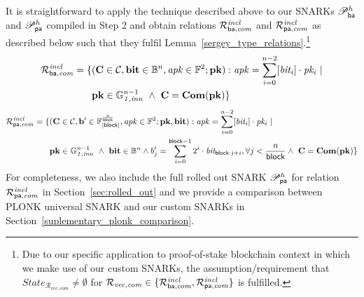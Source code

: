 \noindent It is straightforward to apply the technique described above to our SNARKs $\mathscr{P}_{\mathsf{ba}}^{h}$ and $\mathscr{P}_{\mathsf{pa}}^{h}$ 
compiled in Step 2 and obtain relations $\mathcal{R}^{\mathit{incl}}_{\mathsf{ba},\mathit{com}}$ and $\mathcal{R}^{\mathit{incl}}_{\mathsf{pa},\mathit{com}}$ as described below such that they fulfil Lemma~\ref{sergey_type_relations}.\footnote{Due to our specific application to proof-of-stake blockchain context in which we make use of our custom SNARKs, 
the assumption/requirement that  $\mathit{State}_{\mathcal{R}_{\mathit{vec}, \mathit{com}}} \neq \emptyset$ for 
$\mathcal{R}_{\mathit{vec}, \mathit{com}} \in \{\mathcal{R}^{\mathit{incl}}_{\mathsf{ba},\mathit{com}}, \mathcal{R}^{\mathit{incl}}_{\mathsf{pa},\mathit{com}} \}$ is fulfilled.}
\begin{align*}
 {\mathcal{R}^{\mathit{incl}}_{\mathsf{ba},\mathit{com}}} = \{ & (\mathbf{C} \in \mathcal{C}, \mathbf{bit} \in \mathbb{B}^n, \mathit{apk} \in \mathbb{F}^2; \mathbf{pk}) : \mathit{apk} = \sum_{i=0}^{n-2} [\mathit{bit_i}] \cdot \mathit{pk_i} \ | \\ 
& \mathbf{pk} \in \mathbb{G}_{\mathit{1,inn}}^{n-1} \ \wedge \  \mathbf{C} = \mathbf{Com}(\mathbf{pk}) \} 
\end{align*}
\begin{align*}
 {\mathcal{R}^{\mathit{incl}}_{\mathsf{pa},\mathit{com}}}  = \{ & (\mathbf{C} \in \mathcal{C}, \mathbf{b'} \in \mathbb{F}_{|\mathsf{block}|}^{\frac{n}{\mathsf{block}}}, \mathit{apk} \in \mathbb{F}^2;\mathbf{pk}, \mathbf{bit}) : \mathit{apk} = \sum_{i=0}^{n-2} [\mathit{bit_i}] \cdot \mathit{pk_i} \ | \\ 
& \mathbf{pk} \in \mathbb{G}_{\mathit{1,inn}}^{n-1} \ \wedge \ \mathbf{bit} \in \mathbb{B}^n  \wedge b'_{j} = \sum_{i=0}^{\mathsf{block} -1}2^i \cdot \mathit{bit_{\mathsf{block} \cdot j + i}}, \forall j < \frac{n}{\mathsf{block}}  \wedge \  \mathbf{C} = \mathbf{Com}(\mathbf{pk}) \} 
\end{align*}
For completeness, we also include the full rolled out SNARK $\mathscr{P}_{\mathsf{pa}}^{h}$ for relation $\mathcal{R}^{\mathit{incl}}_{\mathsf{pa},\mathit{com}}$ in Section~\ref{sec:rolled_out} and we provide a comparison between PLONK universal 
SNARK and our custom SNARKs in Section~\ref{suplementary_plonk_comparison}.  
